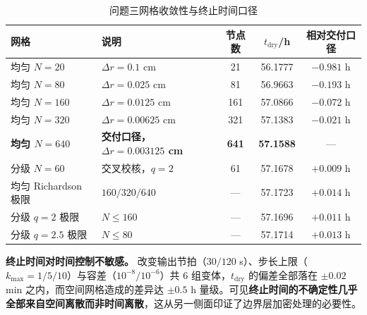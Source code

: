 \begin{table}[H]
  \centering
  \caption{问题三网格收敛性与终止时间口径}
  \label{tab:p3_grid}
  \begin{tabular}{llccc}
    \toprule
    网格 & 说明 & 节点数 & $t_{\text{dry}}$/h & 相对交付口径 \\
    \midrule
    均匀 $N=20$  & $\Delta r=0.1$ cm     & 21  & 56.1777 & $-0.981$ h \\
    均匀 $N=80$  & $\Delta r=0.025$ cm   & 81  & 56.9663 & $-0.193$ h \\
    均匀 $N=160$ & $\Delta r=0.0125$ cm  & 161 & 57.0866 & $-0.072$ h \\
    均匀 $N=320$ & $\Delta r=0.00625$ cm & 321 & 57.1383 & $-0.021$ h \\
    \textbf{均匀 $N=640$} & \textbf{交付口径，$\Delta r=0.003125$ cm} & \textbf{641} & \textbf{57.1588} & --- \\
    分级 $N=60$  & 交叉校核，$q=2$ & 61 & 57.1678 & $+0.009$ h \\
    均匀 Richardson 极限 & $160/320/640$ & --- & 57.1723 & $+0.014$ h \\
    分级 $q=2$ 极限 & $N\le160$ & --- & 57.1696 & $+0.011$ h \\
    分级 $q=2.5$ 极限 & $N\le80$ & --- & 57.1714 & $+0.013$ h \\
    \bottomrule
  \end{tabular}
\end{table}

\textbf{终止时间对时间控制不敏感。} 改变输出节拍（$30/120$ s）、步长上限（$k_{\max}=1/5/10$）与容差（$10^{-8}/10^{-6}$）共 $6$ 组变体，$t_{\text{dry}}$ 的偏差全部落在 $\pm0.02$ min 之内，而空间网格造成的差异达 $\pm0.5$ h 量级。可见\textbf{终止时间的不确定性几乎全部来自空间离散而非时间离散}，这从另一侧面印证了边界层加密处理的必要性。


